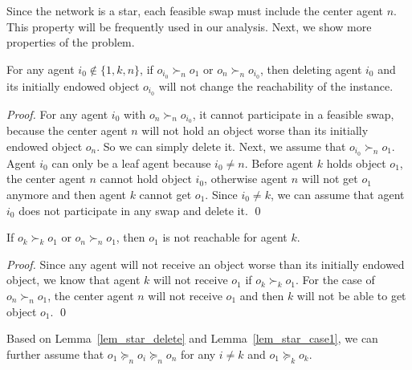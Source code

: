 Since the network is a star, each feasible swap must include the center agent $n$. This property will be frequently used in our analysis.
Next, we show more properties of the problem.



\begin{lemma}\label{lem_star_delete}
    For any agent $i_0\not\in\{1,k,n\}$, if $o_{i_0}\succ_n o_1$ or $o_n \succ_n o_{i_0}$, then deleting agent $i_0$ and its initially endowed object $o_{i_0}$ will not change the reachability of the instance.
\end{lemma}
\begin{proof}
For any agent $i_0$ with $o_n \succ_n o_{i_0}$, it cannot participate in a feasible swap, because the center agent $n$ will not hold an object worse than its initially endowed object $o_n$.
So we can simply delete it. Next, we assume that $o_{i_0}\succ_n o_1$.
Agent $i_0$ can only be a leaf agent because $i_0\neq n$. Before agent $k$ holds object $o_1$, the center agent $n$ cannot hold object $i_0$, otherwise agent $n$ will not
get $o_1$ anymore and then agent $k$ cannot get $o_1$. Since $i_0\neq k$, we can assume that agent $i_0$ does not participate in any swap and delete it.
\qed
\end{proof}

\begin{lemma}\label{lem_star_case1}
If $o_k\succ_k o_1$ or $o_n\succ_n o_1$, then $o_1$ is not reachable for agent $k$.
\end{lemma}
\begin{proof}
Since any agent will not receive an object worse than its initially endowed object, we know that agent $k$ will not receive $o_1$ if $o_k\succ_k o_1$.
For the case of $o_n\succ_n o_1$, the center agent $n$ will not receive $o_1$ and then $k$ will not be able to get object $o_1$.
\qed
\end{proof}

Based on Lemma~\ref{lem_star_delete} and Lemma~\ref{lem_star_case1}, we can further assume that $o_1\succeq_n o_i \succeq_n o_n$ for any $i\neq k$ and $o_1\succeq_k o_k$.


